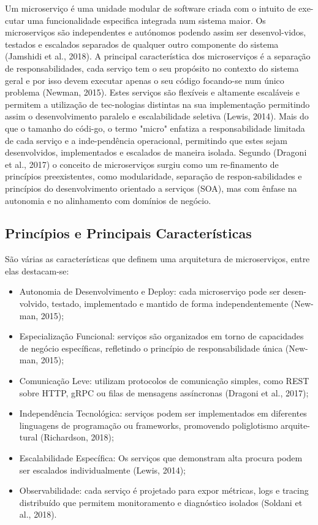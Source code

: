 Um microserviço é uma unidade modular de software criada com o intuito de exe-cutar uma funcionalidade especifica integrada num sistema maior. 
Os microserviços são independentes e autónomos podendo assim ser desenvol-vidos, testados e escalados separados de qualquer outro componente do sistema (Jamshidi et al., 2018).
A principal característica dos microserviços é a separação de responsabilidades, cada serviço tem o seu propósito no contexto do sistema geral e por isso devem executar apenas o seu código focando-se num único problema (Newman, 2015). Estes serviços são flexíveis e altamente escaláveis e permitem a utilização de tec-nologias distintas na sua implementação permitindo assim o desenvolvimento paralelo e escalabilidade seletiva (Lewis, 2014). Mais do que o tamanho do códi-go, o termo "micro" enfatiza a responsabilidade limitada de cada serviço e a inde-pendência operacional, permitindo que estes sejam desenvolvidos, implementados e escalados de maneira isolada. 
Segundo (Dragoni et al., 2017) o conceito de microserviços surgiu como um re-finamento de princípios preexistentes, como modularidade, separação de respon-sabilidades e princípios do desenvolvimento orientado a serviços (SOA), mas com ênfase na autonomia e no alinhamento com domínios de negócio.

\subsection{Princípios e Principais Características}

São várias as características que definem uma arquitetura de microserviços, entre elas destacam-se:

\begin{itemize}
    \item Autonomia de Desenvolvimento e Deploy: cada microserviço pode ser desen-volvido, testado, implementado e mantido de forma independentemente (New-man, 2015);
    \item Especialização Funcional: serviços são organizados em torno de capacidades de negócio específicas, refletindo o princípio de responsabilidade única (New-man, 2015);
    \item Comunicação Leve: utilizam protocolos de comunicação simples, como REST sobre HTTP, gRPC ou filas de mensagens assíncronas (Dragoni et al., 2017);
    \item Independência Tecnológica: serviços podem ser implementados em diferentes linguagens de programação ou frameworks, promovendo poliglotismo arquite-tural (Richardson, 2018);
    \item Escalabilidade Específica: Os serviços que demonstram alta procura podem ser escalados individualmente (Lewis, 2014);
    \item Observabilidade: cada serviço é projetado para expor métricas, logs e tracing distribuído que permitem monitoramento e diagnóstico isolados (Soldani et al., 2018).
\end{itemize}

